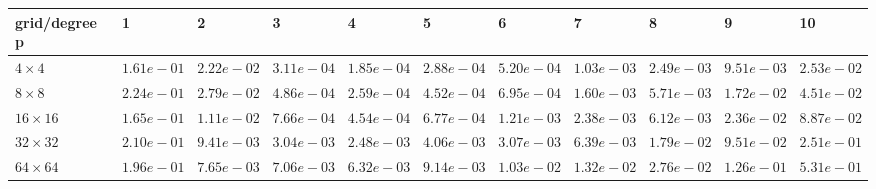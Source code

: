 \begin{tabular}{lllllllllll}
\hline
 grid/degree p   & 1          & 2          & 3          & 4          & 5          & 6          & 7          & 8          & 9          & 10         \\
\hline
 $4 \times 4$    & $1.61e-01$ & $2.22e-02$ & $3.11e-04$ & $1.85e-04$ & $2.88e-04$ & $5.20e-04$ & $1.03e-03$ & $2.49e-03$ & $9.51e-03$ & $2.53e-02$ \\
 $8 \times 8$    & $2.24e-01$ & $2.79e-02$ & $4.86e-04$ & $2.59e-04$ & $4.52e-04$ & $6.95e-04$ & $1.60e-03$ & $5.71e-03$ & $1.72e-02$ & $4.51e-02$ \\
 $16 \times 16$  & $1.65e-01$ & $1.11e-02$ & $7.66e-04$ & $4.54e-04$ & $6.77e-04$ & $1.21e-03$ & $2.38e-03$ & $6.12e-03$ & $2.36e-02$ & $8.87e-02$ \\
 $32 \times 32$  & $2.10e-01$ & $9.41e-03$ & $3.04e-03$ & $2.48e-03$ & $4.06e-03$ & $3.07e-03$ & $6.39e-03$ & $1.79e-02$ & $9.51e-02$ & $2.51e-01$ \\
 $64 \times 64$  & $1.96e-01$ & $7.65e-03$ & $7.06e-03$ & $6.32e-03$ & $9.14e-03$ & $1.03e-02$ & $1.32e-02$ & $2.76e-02$ & $1.26e-01$ & $5.31e-01$ \\
\hline
\end{tabular}